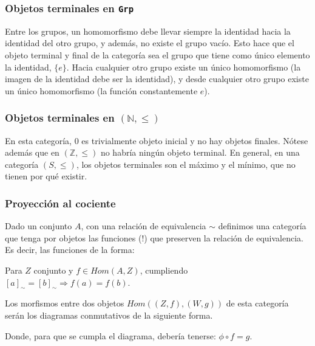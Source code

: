 \documentclass[a4paper, 11pt]{amsart}
\theoremstyle{definition}
\theoremstyle{remark}
\numberwithin{equation}{section}
\begin{document}
    \subsubsection {Objetos terminales en \texttt{Grp}}
      Entre los grupos, un homomorfismo debe llevar siempre la identidad hacia la identidad
      del otro grupo, y además, no existe el grupo vacío. Esto hace que el objeto terminal
      y final de la categoría sea el grupo que tiene como único elemento la identidad, $\{e\}$.
      Hacia cualquier otro grupo existe un único homomorfismo (la imagen de la identidad debe ser
      la identidad), y desde cualquier otro grupo existe un único homomorfismo (la función 
      constantemente $e$).
    
    \subsubsection {Objetos terminales en $(\mathbb{N},\leq)$}
      En esta categoría, $0$ es trivialmente objeto inicial y no hay objetos finales.
      Nótese además que en $(\mathbb{Z},\leq)$ no habría ningún objeto terminal. En general,
      en una categoría $(S,\leq)$, los objetos terminales son el máximo y el mínimo, que
      no tienen por qué existir.
    
    \subsubsection {Proyección al cociente}
      Dado un conjunto $A$, con una relación de equivalencia $\sim$ definimos una categoría
      que tenga por objetos las funciones (!) que preserven la relación de equivalencia.
      Es decir, las funciones de la forma:
      \begin{center}
      \end{center}
      Para $Z$ conjunto y $f \in Hom(A,Z)$, cumpliendo $[a]_{\sim} = [b]_{\sim} \Rightarrow f(a) = f(b)$.
      
      Los morfismos entre dos objetos $Hom((Z,f), (W,g))$ de esta categoría serán los diagramas
      conmutativos de la siguiente forma.
      \begin{center}
      \end{center}
      Donde, para que se cumpla el diagrama, debería tenerse: $\phi \circ f = g$.
      
\end{document}
